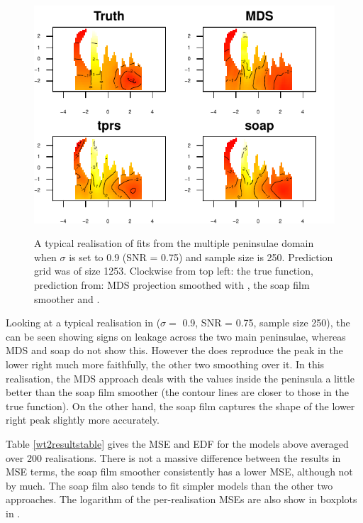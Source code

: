 \begin{figure}
\centering
\includegraphics[width=6in]{mds/figs/wt2-comp-09.pdf} \\
\caption{A typical realisation of fits from the multiple peninsulae domain when $\sigma$ is set to 0.9 (SNR = 0.75) and sample size is 250. Prediction grid was of size 1253. Clockwise from top left: the true function, prediction from: MDS projection smoothed with \tprs, the soap film smoother and \tprs.}
\label{wt2-comp-0.9}
\end{figure}

Looking at a typical realisation in  ($\sigma=$ 0.9, SNR = 0.75, sample size 250), the \tprs can be seen showing signs on leakage across the two main peninsulae, whereas MDS and soap do not show this. However the \tprs does reproduce the peak in the lower right much more faithfully, the other two smoothing over it. In this realisation, the MDS approach deals with the values inside the peninsula a little better than the soap film smoother (the contour lines are closer to those in the true function). On the other hand, the soap film captures the shape of the lower right peak slightly more accurately.

Table \ref{wt2resultstable} gives the MSE and EDF for the models above averaged over 200 realisations. There is not a massive difference between the results in MSE terms, the soap film smoother consistently has a lower MSE, although not by much. The soap film also tends to fit simpler models than the other two approaches. The logarithm of the per-realisation MSEs are also show in boxplots in .


